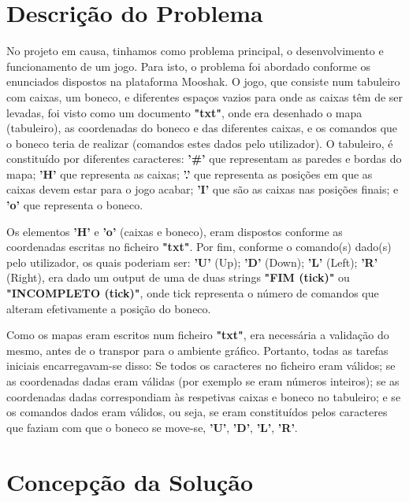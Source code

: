 \documentclass[a4paper]{article}
\begin{document}
\section{Descrição do Problema}
\label{sec:problema}

No projeto em causa, tinhamos como problema principal, o desenvolvimento e funcionamento de um jogo. Para isto, o problema foi abordado conforme os enunciados dispostos na plataforma Mooshak. O jogo, que consiste num tabuleiro com caixas, um boneco, e diferentes espaços vazios para onde as caixas têm de ser levadas, foi visto como um documento \textbf{"txt"}, onde era desenhado o mapa (tabuleiro), as coordenadas do boneco e das diferentes caixas, e os comandos que o boneco teria de realizar (comandos estes dados pelo utilizador). O tabuleiro, é constituído por diferentes caracteres: \textbf{'\#'} que representam as paredes e bordas do mapa; \textbf{'H'} que representa as caixas; \textbf{'.'} que representa as posições em que as caixas devem estar para o jogo acabar; \textbf{'I'} que são as caixas nas posições finais; e \textbf{'o'} que representa o boneco. \par

Os elementos \textbf{'H'} e \textbf{'o'} (caixas e boneco), eram dispostos conforme as coordenadas escritas no ficheiro \textbf{"txt"}. Por fim, conforme o comando(s) dado(s) pelo utilizador, os quais poderiam ser: \textbf{'U'} (Up); \textbf{'D'} (Down); \textbf{'L'} (Left); \textbf{'R'} (Right), era dado um output de uma de duas strings \textbf{"FIM (tick)"} ou \textbf{"INCOMPLETO (tick)"}, onde tick representa o número de comandos que alteram efetivamente a posição do boneco. \par

Como os mapas eram escritos num ficheiro \textbf{"txt"}, era necessária a validação do mesmo, antes de o transpor para o ambiente gráfico. Portanto, todas as tarefas iniciais encarregavam-se disso: Se todos os caracteres no ficheiro eram válidos; se as coordenadas dadas eram válidas (por exemplo se eram números inteiros); se as coordenadas dadas correspondiam às respetivas caixas e boneco no tabuleiro; e se os comandos dados eram válidos, ou seja, se eram constituídos pelos caracteres que faziam com que o boneco se move-se, \textbf{'U'}, \textbf{'D'}, \textbf{'L'}, \textbf{'R'}.




\section{Concepção da Solução}
\label{sec:solucao}
\end{document}
